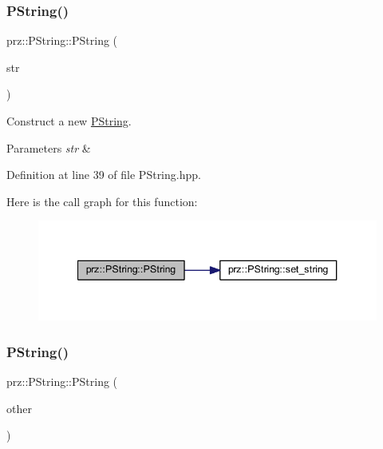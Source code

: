 \subsubsection{\texorpdfstring{PString()}{PString()}\hspace{0.1cm}{\footnotesize\ttfamily [2/3]}}
{\footnotesize\ttfamily prz\+::\+P\+String\+::\+P\+String (\begin{DoxyParamCaption}\item[{const string \&}]{str }\end{DoxyParamCaption})\hspace{0.3cm}{\ttfamily [inline]}}



Construct a new \mbox{\hyperlink{classprz_1_1_p_string}{P\+String}}. 


\begin{DoxyParams}{Parameters}
{\em str} & \\
\hline
\end{DoxyParams}


Definition at line 39 of file P\+String.\+hpp.

Here is the call graph for this function\+:
\nopagebreak
\begin{figure}[H]
\begin{center}
\leavevmode
\includegraphics[width=340pt]{classprz_1_1_p_string_a49564845487998ce0fe4062df21dd857_cgraph}
\end{center}
\end{figure}
\mbox{\label{classprz_1_1_p_string_ae72acc504d808db97ea7a35db14ff36a}} 
\subsubsection{\texorpdfstring{PString()}{PString()}\hspace{0.1cm}{\footnotesize\ttfamily [3/3]}}
{\footnotesize\ttfamily prz\+::\+P\+String\+::\+P\+String (\begin{DoxyParamCaption}\item[{const \mbox{\hyperlink{classprz_1_1_p_string}{P\+String}} \&}]{other }\end{DoxyParamCaption})\hspace{0.3cm}{\ttfamily [inline]}}



